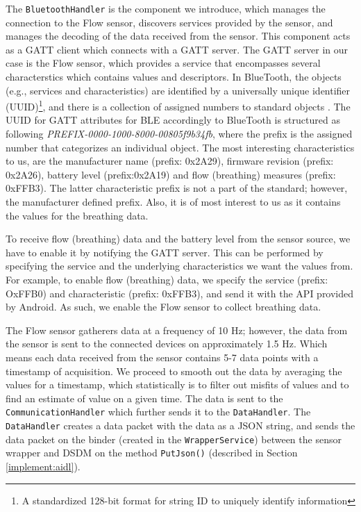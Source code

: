 The \verb|BluetoothHandler| is the component we introduce, which manages the connection to the Flow sensor, discovers services provided by the sensor, and manages the decoding of the data received from the sensor. This component acts as a GATT client which connects with a GATT server. The GATT server in our case is the Flow sensor, which provides a service that encompasses several characterstics which contains values and descriptors. In BlueTooth, the objects (e.g., services and characteristics) are identified by a universally unique identifier (UUID)\footnote{A standardized 128-bit format for string ID to uniquely identify information}, and there is a collection of assigned numbers to standard objects \cite{uuid}. The UUID for GATT attributes for BLE accordingly to BlueTooth is structured as following \textit{PREFIX-0000-1000-8000-00805f9b34fb}, where the prefix is the assigned number that categorizes an individual object. The most interesting characteristics to us, are the manufacturer name (prefix: 0x2A29), firmware revision (prefix: 0x2A26), battery level (prefix:0x2A19) and flow (breathing) measures (prefix: 0xFFB3). The latter characteristic prefix is not a part of the standard; however, the manufacturer defined prefix. Also, it is of most interest to us as it contains the values for the breathing data. 

To receive flow (breathing) data and the battery level from the sensor source, we have to enable it by notifying the GATT server. This can be performed by specifying the service and the underlying characteristics we want the values from. For example, to enable flow (breathing) data, we specify the service (prefix: OxFFB0) and characteristic (prefix: 0xFFB3), and send it with the API provided by Android.  As such, we enable the Flow sensor to collect breathing data. 

The Flow sensor gatherers data at a frequency of 10 Hz; however, the data from the sensor is sent to the connected devices on approximately 1.5 Hz. Which means each data received from the sensor contains 5-7 data points with a timestamp of acquisition. We proceed to smooth out the data by averaging the values for a timestamp, which statistically is to filter out misfits of values and to find an estimate of value on a given time. The data is sent to the \verb|CommunicationHandler| which further sends it to the \verb|DataHandler|. The \verb|DataHandler| creates a data packet with the data as a JSON string, and sends the data packet on the binder (created in the \verb|WrapperService|) between the sensor wrapper and DSDM on the method \verb|PutJson()| (described in Section \ref{implement:aidl}). 

